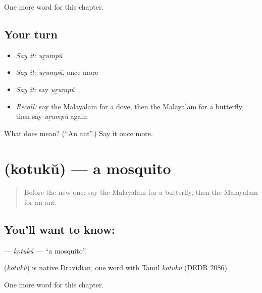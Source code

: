 \begin{grammarlens}[title={What you've built}]
One more word for this chapter.
\end{grammarlens}

\subsection*{Your turn}
\begin{itemize}
\raggedright
  \item \emph{Say it:} \emph{uṟumpŭ}
  \item \emph{Say it:} \emph{uṟumpŭ}, once more
  \item \emph{Say it:} say \emph{uṟumpŭ}
  \item \emph{Recall:} say the Malayalam for a dove, then the Malayalam for a butterfly, then say \emph{uṟumpŭ} again
\end{itemize}

\begin{tcolorbox}[breakable,colback=teal!4,colframe=teal!35!black,title={Before you move on}]
What does  mean? (\textquotedblleft{}An ant\textquotedblright{}.) Say it once more.
\end{tcolorbox}
\section[\texorpdfstring{\ml{കൊതുക്} (kotukŭ)}{കൊതുക് (kotukŭ)}]{ (kotukŭ) — a mosquito}

\label{lesson:ML-C153-kotuku}



\begin{quote}
Before the new one: say the Malayalam for a butterfly, then the Malayalam for an ant.
\end{quote}

\subsection*{You'll want to know: }
\textbf{} — \emph{kotukŭ} — \textquotedblleft{}a mosquito\textquotedblright{}.

\begin{cousinweb}
\textbf{} (\emph{kotukŭ}) is native Dravidian, one word with Tamil \emph{kotuku} (DEDR 2086).
\end{cousinweb}

\begin{grammarlens}[title={What you've built}]
One more word for this chapter.
\end{grammarlens}

